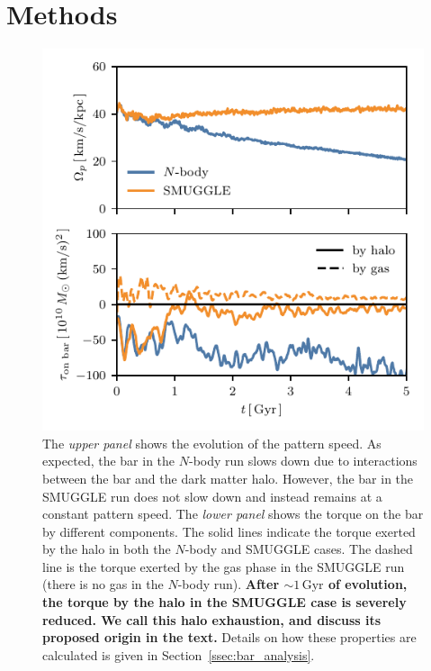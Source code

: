 \documentclass[twocolumn,linenumbers,trackchanges]{aastex631}
\newcommand{\Nbody}{$N$-body}
\newcommand{\SMUGGLE}{SMUGGLE}
\begin{document}

\section{Methods}
\label{sec:methods}
\begin{figure}
    \centering
    \includegraphics[width=\columnwidth]{fig/ps_torque.pdf}
    \caption{The \textit{upper panel} shows the evolution of the pattern speed.
    As expected, the bar in the \Nbody{} run slows down due to interactions
    between the bar and the dark matter halo. However, the bar in the \SMUGGLE{}
    run does not slow down and instead remains at a constant pattern speed. The
    \textit{lower panel} shows the torque on the bar by different components.
    The solid lines indicate the torque exerted by the halo in both the \Nbody{}
    and \SMUGGLE{} cases. The dashed line is the torque exerted by the gas phase
    in the \SMUGGLE{} run (there is no gas in the \Nbody{} run). {\bf After
    $\sim1\,\textrm{Gyr}$ of evolution, the torque by the halo in the \SMUGGLE{}
    case is severely reduced. We call this halo exhaustion, and discuss its
    proposed origin in the text.} Details on how these properties are calculated
    is given in Section~\ref{ssec:bar_analysis}.}\label{fig:prop}
\end{figure}
\end{document}
